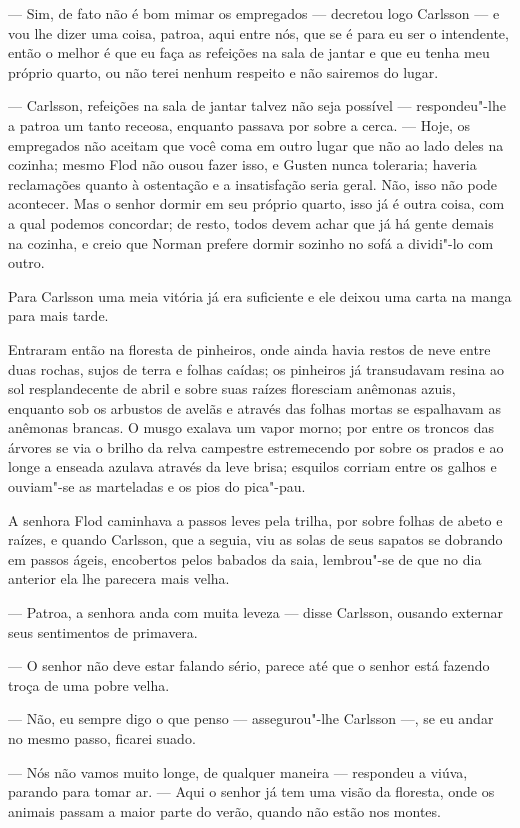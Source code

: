--- Sim, de fato não é bom mimar os empregados --- decretou logo Carlsson --- e vou
lhe dizer uma coisa, patroa, aqui entre nós, que se é para eu ser o intendente,
então o melhor é que eu faça as refeições na sala de jantar e que eu tenha meu
próprio quarto, ou não terei nenhum respeito e não sairemos do lugar.

--- Carlsson, refeições na sala de jantar talvez não seja possível ---
respondeu"-lhe a patroa um tanto receosa, enquanto passava por sobre a cerca. ---
Hoje, os empregados não aceitam que você coma em outro lugar que não ao lado
deles na cozinha; mesmo Flod não ousou fazer isso, e Gusten nunca toleraria;
haveria reclamações quanto à ostentação e a insatisfação seria geral. Não, isso
não pode acontecer. Mas o senhor dormir em seu próprio quarto, isso já é outra
coisa, com a qual podemos concordar; de resto, todos devem achar que já há gente
demais na cozinha, e creio que Norman prefere dormir sozinho no sofá a dividi"-lo
com outro.

Para Carlsson uma meia vitória já era suficiente e ele deixou uma carta na manga
para mais tarde.

Entraram então na floresta de pinheiros, onde ainda havia restos de neve entre
duas rochas, sujos de terra e folhas caídas; os pinheiros já transudavam resina
ao sol resplandecente de abril e sobre suas raízes floresciam anêmonas azuis,
enquanto sob os arbustos de avelãs e através das folhas mortas se espalhavam as
anêmonas brancas. O musgo exalava um vapor morno; por entre os troncos das
árvores se via o brilho da relva campestre estremecendo por sobre os prados e ao
longe a enseada azulava através da leve brisa; esquilos corriam entre os galhos e
ouviam"-se as marteladas e os pios do pica"-pau.

A senhora Flod caminhava a passos leves pela trilha, por sobre folhas de abeto e
raízes, e quando Carlsson, que a seguia, viu as solas de seus sapatos se
dobrando em passos ágeis, encobertos pelos babados da saia, lembrou"-se de que
no dia anterior ela lhe parecera mais velha.

--- Patroa, a senhora anda com muita leveza --- disse Carlsson, ousando externar seus
sentimentos de primavera.

--- O senhor não deve estar falando sério, parece até que o senhor está fazendo troça de uma pobre
velha.

--- Não, eu sempre digo o que penso --- assegurou"-lhe Carlsson ---, se eu andar no
mesmo passo, ficarei suado.

--- Nós não vamos muito longe, de qualquer maneira --- respondeu a viúva, parando
para tomar ar. --- Aqui o senhor já tem uma visão da floresta, onde os animais
passam a maior parte do verão, quando não estão nos montes.

